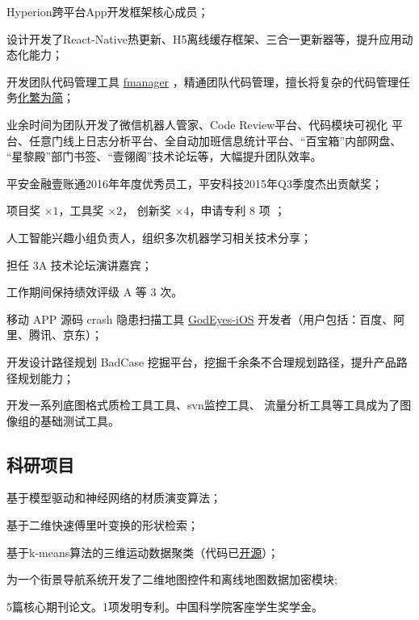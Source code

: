 {
  \begin{tightitemize}%
  \item Hyperion跨平台App开发框架核心成员；
  \item 设计开发了React-Native热更新、H5离线缓存框架、三合一更新器等，提升应用动
    态化能力；
  \item 开发团队代码管理工具
    \href{http://hahack.com/work/enterprise-class-git-version-control-1/}{fmanager}
    ，精通团队代码管理，擅长将复杂的代码管理任务\href{http://hahack.com/tags/Git/}{化繁为简}；
  \item 业余时间为团队开发了微信机器人管家、Code Review平台、代码模块可视化
    平台、任意门线上日志分析平台、全自动加班信息统计平台、“百宝箱”内部网盘、
    “星黎殿”部门书签、“壹翎阁”技术论坛等，大幅提升团队效率。
  \item 平安金融壹账通2016年年度优秀员工，平安科技2015年Q3季度杰出贡献奖；
  \item 项目奖 $\times 1$，工具奖 $\times 2$， 创新奖 $\times 4$，申请专利 8 项
    ；
  \item 人工智能兴趣小组负责人，组织多次机器学习相关技术分享；
  \item 担任 3A 技术论坛演讲嘉宾；
  \item 工作期间保持绩效评级 A 等 3 次。
 \end{tightitemize}}

{
  \begin{tightitemize}%
  \item 移动 APP 源码 crash 隐患扫描工具 \href{http://godeyes.duapp.com}{GodEyes-iOS} 开发者（用户包括：百度、阿里、腾讯、京东）；
  \item 开发设计路径规划 BadCase 挖掘平台，挖掘千余条不合理规划路径，提升产品路
    径规划能力；
  \item 开发一系列底图格式质检工具工具、svn监控工具、
    流量分析工具等工具成为了图像组的基础测试工具。
 \end{tightitemize}}

\newpage

\subsection{\hei 科研项目}

{
  \begin{tightitemize}%
  \item 基于模型驱动和神经网络的材质演变算法；
  \item 基于二维快速傅里叶变换的形状检索；
  \item 基于k-means算法的三维运动数据聚类（代码已\href{https://github.com/wzpan/MotionSegmentation3D}{开源}）；
  \item 为一个街景导航系统开发了二维地图控件和离线地图数据加密模块;
  \item 5篇核心期刊论文。1项发明专利。中国科学院客座学生奖学金。
\end{tightitemize}}

